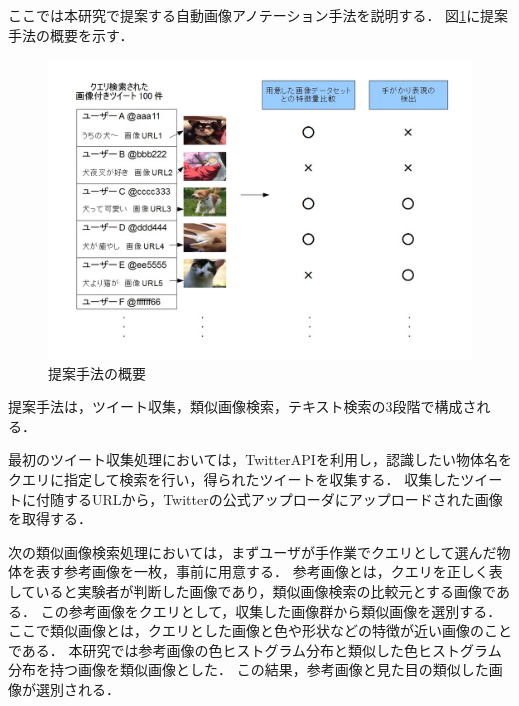 \documentclass{deimj}
\begin{document}
ここでは本研究で提案する自動画像アノテーション手法を説明する．
図\ref{fig:way}に提案手法の概要を示す．
%
\begin{figure}[tb]
 \begin{center}
  \includegraphics[scale=0.29]{way.jpg}
 \end{center}
 \caption{提案手法の概要}
 \label{fig:way}
\end{figure}
%
提案手法は，ツイート収集，類似画像検索，テキスト検索の3段階で構成される．



最初のツイート収集処理においては，TwitterAPIを利用し，認識したい物体名をクエリに指定して検索を行い，得られたツイートを収集する．
収集したツイートに付随するURLから，Twitterの公式アップローダにアップロードされた画像を取得する．

次の類似画像検索処理においては，まずユーザが手作業でクエリとして選んだ物体を表す参考画像を一枚，事前に用意する．
参考画像とは，クエリを正しく表していると実験者が判断した画像であり，類似画像検索の比較元とする画像である．
この参考画像をクエリとして，収集した画像群から類似画像を選別する．
ここで類似画像とは，クエリとした画像と色や形状などの特徴が近い画像のことである．
本研究では参考画像の色ヒストグラム分布と類似した色ヒストグラム分布を持つ画像を類似画像とした．
この結果，参考画像と見た目の類似した画像が選別される．
\end{document}
